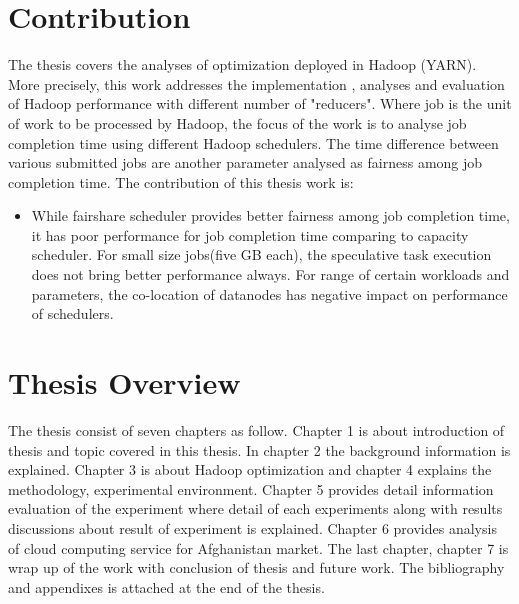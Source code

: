 \section{Contribution}

The thesis covers the analyses of optimization deployed in Hadoop (YARN). More precisely, this work addresses the implementation , analyses and evaluation of Hadoop performance with different number of "reducers". Where job is the unit of work to be processed by Hadoop, the focus of the work is to analyse job completion time using different Hadoop schedulers. The time difference between various submitted jobs are another parameter analysed as fairness among job completion time. The contribution of this thesis work is:
\begin{itemize}
 \item{ While fairshare scheduler provides better fairness among job completion time, it has poor performance for job completion time comparing to capacity scheduler. For small size jobs(five GB each), the speculative task execution does not bring better performance always. For range of certain workloads and parameters,  the co-location of datanodes has negative impact on performance of schedulers. }   
\end{itemize} 



\section{Thesis Overview}

The thesis consist of seven chapters as follow. Chapter 1 is about introduction of thesis and topic covered in this thesis. In chapter 2 the background information is explained. Chapter 3 is about Hadoop optimization and chapter 4 explains the methodology, experimental environment. Chapter 5 provides detail information evaluation of the experiment where detail of each experiments along with results discussions about result of experiment is explained. Chapter 6 provides analysis of cloud computing service for Afghanistan market. The last chapter, chapter 7 is wrap up of the work with conclusion of thesis and future work. The bibliography and appendixes is attached at the end of the thesis. 


